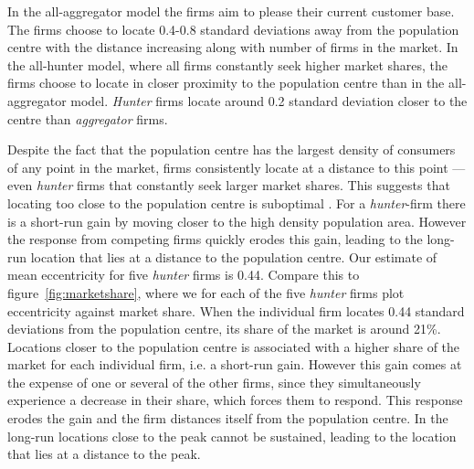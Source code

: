\documentclass[preprint, 12pt]{elsarticle}
\begin{document}
In the all-aggregator model the firms aim to please their current customer base. The firms choose to locate 0.4-0.8 standard deviations away from the population centre with the distance increasing along with number of firms in the market. In the all-hunter model, where all firms constantly seek higher market shares, the firms choose to locate in closer proximity to the population centre than in the all-aggregator model. \emph{Hunter} firms locate around 0.2 standard deviation closer to the centre than \emph{aggregator} firms.


Despite the fact that the population centre has the largest density of consumers of any point in the market, firms consistently locate at a distance to this point — even \emph{hunter} firms that constantly seek larger market shares. This suggests that locating too close to the population centre is suboptimal \citep[chapter~5]{Laver_Sergenti_2011}. For a \emph{hunter}-firm there is a short-run gain by moving closer to the high density population area. However the response from competing firms quickly erodes this gain, leading to the long-run location that lies at a distance to the population centre. Our estimate of mean eccentricity for five \emph{hunter} firms is 0.44. Compare this to figure~\ref{fig:marketshare}, where we for each of the five \emph{hunter} firms plot eccentricity against market share. When the individual firm locates 0.44 standard deviations from the population centre, its share of the market is around 21\%. Locations closer to the population centre is associated with a higher share of the market for each individual firm, i.e. a short-run gain. However this gain comes at the expense of one or several of the other firms, since they simultaneously experience a decrease in their share, which forces them to respond. This response erodes the gain and the firm distances itself from the population centre. In the long-run locations close to the peak cannot be sustained, leading to the location that lies at a distance to the peak.
\end{document}
